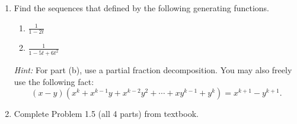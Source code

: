 \documentclass[11pt]{article}%
\theoremstyle{definition}
\begin{document}
\begin{enumerate}
\item Find the sequences that defined by the following generating functions.
\begin{enumerate}
\item $\displaystyle \frac{1}{1-2t}$
\item $\displaystyle \frac{1}{1-5t+6t^2}$
\end{enumerate}
\emph{Hint:} For part (b), use a partial fraction decomposition.  You may also freely use the following fact:
\[
(x-y)(x^k+x^{k-1}y+x^{k-2}y^2+\cdots +xy^{k-1}+y^k)=x^{k+1}-y^{k+1}.
\]
\item Complete Problem 1.5 (all 4 parts) from textbook.
\end{enumerate}
\end{document}

